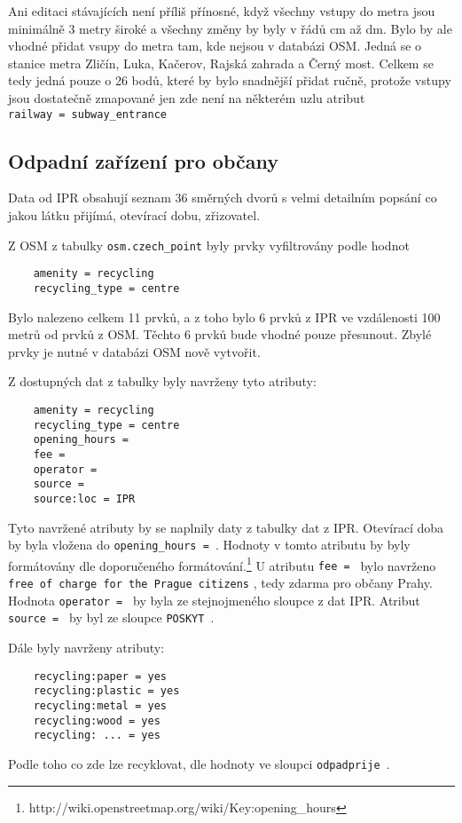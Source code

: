 Ani editaci stávajících není příliš přínosné, když všechny vstupy do metra jsou
minimálně 3 metry široké a všechny změny by byly v řádů cm až dm. 
Bylo by ale vhodné přidat vsupy do metra tam, kde nejsou v databázi OSM.
Jedná se o stanice metra Zličín, Luka, Kačerov, Rajská zahrada a Černý most. 
Celkem se tedy jedná pouze o 26 bodů, které by bylo snadnější přidat ručně, 
protože vstupy jsou dostatečně zmapované jen zde není na některém uzlu atribut {\tt railway~=~subway\_entrance}


\subsection{Odpadní zařízení pro občany}
\label{Odpadní zařízení pro občany}
Data od IPR obsahují seznam 36 směrných dvorů s velmi detailním popsání co 
jakou látku přijímá, otevírací dobu, zřizovatel. 

Z OSM z tabulky {\tt osm.czech\_point} byly prvky vyfiltrovány podle hodnot 
\begin{verbatim}
    amenity = recycling
    recycling_type = centre
\end{verbatim}    
Bylo nalezeno celkem 11 prvků, a z toho bylo 6 prvků z IPR ve vzdálenosti 
100 metrů od prvků z OSM. Těchto 6 prvků bude vhodné pouze přesunout. Zbylé 
prvky je nutné v databázi OSM nově vytvořit.

Z dostupných dat z tabulky byly navrženy tyto atributy: 
\begin{verbatim}
    amenity = recycling
    recycling_type = centre
    opening_hours =
    fee =
    operator = 
    source = 
    source:loc = IPR
\end{verbatim}
Tyto navržené atributy by se naplnily daty z tabulky dat z IPR.
Otevírací doba by byla vložena do {\tt opening\_hours~= }.
Hodnoty v tomto atributu by byly formátovány dle doporučeného formátování.\footnote{http://wiki.openstreetmap.org/wiki/Key:opening\_hours}
 U atributu {\tt fee~= }
bylo navrženo {\tt free of charge for the Prague citizens} , tedy zdarma pro občany Prahy.
Hodnota {\tt operator~= } by byla ze stejnojmeného sloupce z dat IPR.
Atribut {\tt source~= } by byl ze sloupce {\tt POSKYT }.

Dále byly navrženy atributy:
\begin{verbatim}
    recycling:paper = yes
    recycling:plastic = yes
    recycling:metal = yes
    recycling:wood = yes
    recycling: ... = yes
\end{verbatim}
Podle toho co zde lze recyklovat, dle hodnoty ve sloupci {\tt odpadprije }.

